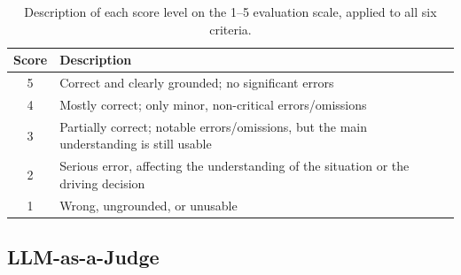 \documentclass[12pt,a4paper]{report}
\begin{document}
\begin{table}[htbp]
    \centering
    \small
    \caption[Description of each score level on the 1--5 evaluation scale]{Description of each score level on the 1--5 evaluation scale, applied to all six criteria.}
    \label{tab:3.6}
    \begin{tabularx}{\linewidth}{@{}cX@{}}
        \toprule
        \textbf{Score} & \textbf{Description} \\
        \midrule
        5 & Correct and clearly grounded; no significant errors \\
        4 & Mostly correct; only minor, non-critical errors/omissions \\
        3 & Partially correct; notable errors/omissions, but the main understanding is still usable \\
        2 & Serious error, affecting the understanding of the situation or the driving decision \\
        1 & Wrong, ungrounded, or unusable \\
        \bottomrule
    \end{tabularx}
\end{table}

\subsection{LLM-as-a-Judge}
\end{document}
